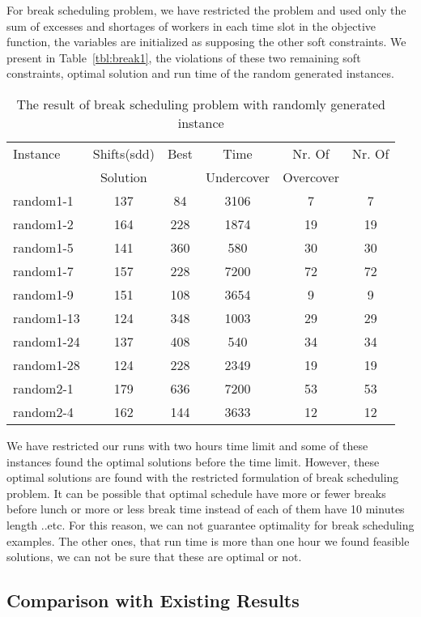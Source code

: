 For break scheduling problem, we have restricted the problem and  used only the sum of excesses and shortages of workers in each time slot in the objective function, the variables are initialized as supposing the other soft constraints. We present in Table~\ref{tbl:break1}, the violations of these two remaining soft constraints, optimal solution and run time of the random generated instances.


\begin{table} \small
\centering
\begin{tabular}{lccccc}
\hline
 Instance & Shifts(sdd) & Best & Time & Nr. Of  & Nr. Of   \\
 &  Solution &  & Undercover & Overcover \\


random1-1  & 137 & 	84	& 3106	&	7 & 7	\\
random1-2  & 164 & 	228	& 1874 	&	19 &19	\\
random1-5  & 141 & 	360	& 580 		&	 30 & 30 		\\	
random1-7  & 157 &	228	& 7200	&	 72 & 72		\\
random1-9  & 151 &	108	& 3654	&	  9  & 9	\\
random1-13 & 124 &	348	& 1003	&	29 & 29	\\
random1-24 & 137 &	408	& 540		&	34 & 34		\\
random1-28 & 124 &	228	& 2349	&	19 & 19	\\	
random2-1   & 179 &	636	& 7200	&	53 & 53	\\
random2-4   & 162 &	144	& 3633	& 	12 & 12		\\

\hline
\end{tabular}
\caption{The result of break scheduling problem with randomly generated instance}
\label{tbl:break}
\end{table}

We have restricted our runs with two hours time limit and some of these instances found the optimal solutions before the time limit. However, these optimal solutions are found with the restricted formulation of break scheduling problem. It can be possible that optimal schedule have more or fewer breaks before lunch or more or less break time instead of each of them have 10 minutes length ..etc. For this reason, we can not guarantee optimality for break scheduling examples. The other ones, that run time is more than one hour we found feasible solutions, we can not be sure that these are optimal or not.

\subsection{Comparison with Existing Results}

